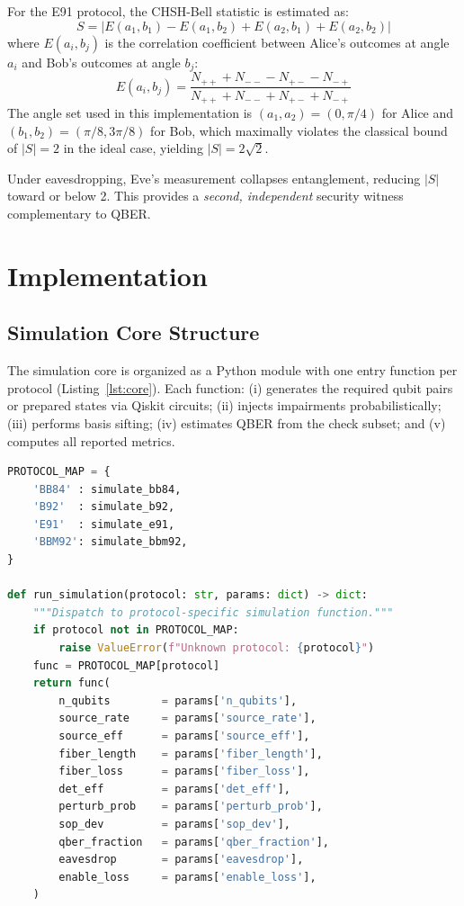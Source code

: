 \documentclass[journal]{IEEEtran}
\begin{document}
For the E91 protocol, the CHSH-Bell statistic is estimated as:
\begin{equation}
  S = |E(a_1,b_1) - E(a_1,b_2) + E(a_2,b_1) + E(a_2,b_2)|
  \label{eq:chsh}
\end{equation}
where $E(a_i, b_j)$ is the correlation coefficient between Alice's
outcomes at angle $a_i$ and Bob's outcomes at angle $b_j$:
\begin{equation}
  E(a_i, b_j) = \frac{N_{++} + N_{--} - N_{+-} - N_{-+}}
                     {N_{++} + N_{--} + N_{+-} + N_{-+}}
  \label{eq:correlation}
\end{equation}
The angle set used in this implementation is
$(a_1, a_2) = (0, \pi/4)$ for Alice and
$(b_1, b_2) = (\pi/8, 3\pi/8)$ for Bob, which maximally violates the
classical bound of $|S|=2$ in the ideal case, yielding $|S|=2\sqrt{2}$.

Under eavesdropping, Eve's measurement collapses entanglement, reducing
$|S|$ toward or below 2. This provides a \emph{second, independent}
security witness complementary to QBER.

\section{Implementation}
\label{sec:implementation}

\subsection{Simulation Core Structure}

The simulation core is organized as a Python module with one entry
function per protocol (Listing~\ref{lst:core}). Each function:
(i) generates the required qubit pairs or prepared states via Qiskit
circuits; (ii) injects impairments probabilistically; (iii) performs
basis sifting; (iv) estimates QBER from the check subset; and
(v) computes all reported metrics.

\begin{lstlisting}[style=qkdcode, language=Python,
    caption={Simulation core dispatcher — single-protocol invocation},
    label={lst:core}]
PROTOCOL_MAP = {
    'BB84' : simulate_bb84,
    'B92'  : simulate_b92,
    'E91'  : simulate_e91,
    'BBM92': simulate_bbm92,
}

def run_simulation(protocol: str, params: dict) -> dict:
    """Dispatch to protocol-specific simulation function."""
    if protocol not in PROTOCOL_MAP:
        raise ValueError(f"Unknown protocol: {protocol}")
    func = PROTOCOL_MAP[protocol]
    return func(
        n_qubits        = params['n_qubits'],
        source_rate     = params['source_rate'],
        source_eff      = params['source_eff'],
        fiber_length    = params['fiber_length'],
        fiber_loss      = params['fiber_loss'],
        det_eff         = params['det_eff'],
        perturb_prob    = params['perturb_prob'],
        sop_dev         = params['sop_dev'],
        qber_fraction   = params['qber_fraction'],
        eavesdrop       = params['eavesdrop'],
        enable_loss     = params['enable_loss'],
    )
\end{lstlisting}
\end{document}
